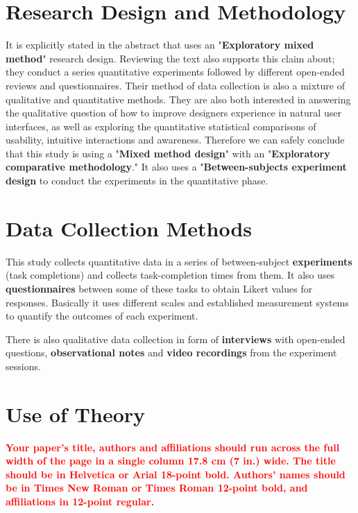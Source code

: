 \documentclass{sigchi}
\begin{document}
\section{Research Design and Methodology}
It is explicitly stated in the abstract that \cite{10.1093/iwc/iwv003} uses an "\textbf{Exploratory mixed method}" research design. Reviewing the text also supports this claim about; they conduct a series quantitative experiments followed by different open-ended reviews and questionnaires. Their method of data collection is also a mixture of qualitative and quantitative methods. They are also both interested in answering the qualitative question of how to improve designers experience in natural user interfaces, as well as exploring the quantitative statistical comparisons of usability, intuitive interactions and awareness. Therefore we can safely conclude that this study is using a "\textbf{Mixed method design}" with an "\textbf{Exploratory comparative methodology}." It also uses a "\textbf{Between-subjects experiment design} to conduct the experiments in the quantitative phase. 

\section{Data Collection Methods}
This study collects quantitative data in a series of between-subject \textbf{experiments} (task completions) and collects task-completion times from them. It also uses \textbf{questionnaires} between some of these tasks to obtain Likert values for responses. Basically it uses different scales and established measurement systems to quantify the outcomes of each experiment. 

There is also qualitative data collection in form of \textbf{interviews} with open-ended questions, \textbf{observational notes} and \textbf{video recordings} from the experiment sessions.

\section{Use of Theory}
\textbf{\textcolor{red}{Your paper's title, authors and affiliations should run across the
full width of the page in a single column 17.8 cm (7 in.) wide.  The
title should be in Helvetica or Arial 18-point bold.  Authors' names
should be in Times New Roman or Times Roman 12-point bold, and
affiliations in 12-point regular. }
} 
\end{document}
